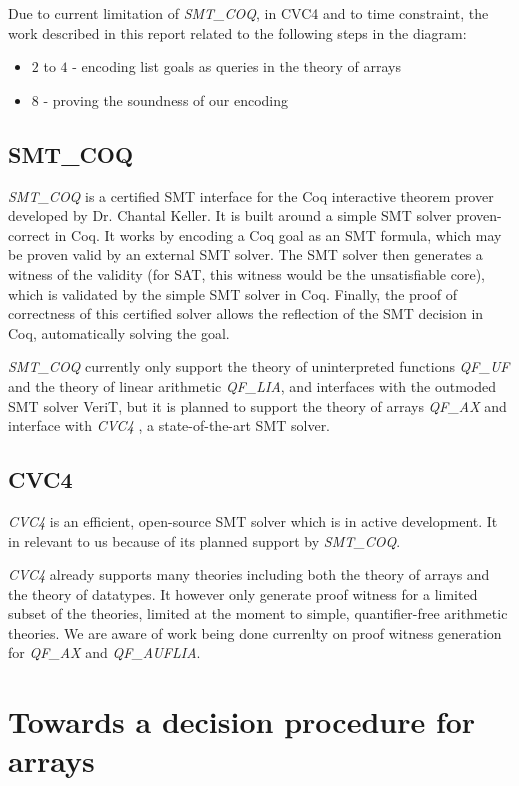\documentclass[onecolumn, preprint]{sigplanconf}
\begin{document}
Due to current limitation of \emph{SMT\_COQ}, in CVC4 and to time constraint, the work described in this report related to the following steps in the diagram:
\begin{itemize}
  \item $2$ to $4$ - encoding list goals as queries in the theory of arrays
  \item $8$ - proving the soundness of our encoding
\end{itemize}



\subsection{SMT\_COQ}
\emph{SMT\_COQ} is a certified SMT interface for the Coq interactive theorem prover developed by Dr. Chantal Keller. It is built around a simple SMT solver proven-correct in Coq.
It works by encoding a Coq goal as an SMT formula, which may be proven valid by an external SMT solver. The SMT solver then generates a witness of the validity (for SAT, this witness would be the unsatisfiable core), which is validated by the simple SMT solver in Coq. Finally, the proof of correctness of this certified solver allows the reflection of the SMT decision in Coq, automatically solving the goal.

\emph{SMT\_COQ} currently only support the theory of uninterpreted functions \emph{QF\_UF} and the theory of linear arithmetic \emph{QF\_LIA}, and interfaces with the outmoded SMT solver VeriT, but it is planned to support the theory of arrays \emph{QF\_AX} and interface with \emph{CVC4} \citep{CVC4}, a state-of-the-art SMT solver.

\subsection{CVC4}
\emph{CVC4} is an efficient, open-source SMT solver which is in active development. It in relevant to us because of its planned support by \emph{SMT\_COQ}.

\emph{CVC4} already supports many theories including both the theory of arrays and the theory of datatypes. It however only generate proof witness for a limited subset of the theories, limited at the moment to simple, quantifier-free arithmetic theories. We are aware of work being done currenlty on proof witness generation for \emph{QF\_AX} and \emph{QF\_AUFLIA}.


\section{Towards a decision procedure for arrays}
\label{sec:solution}
\end{document}
